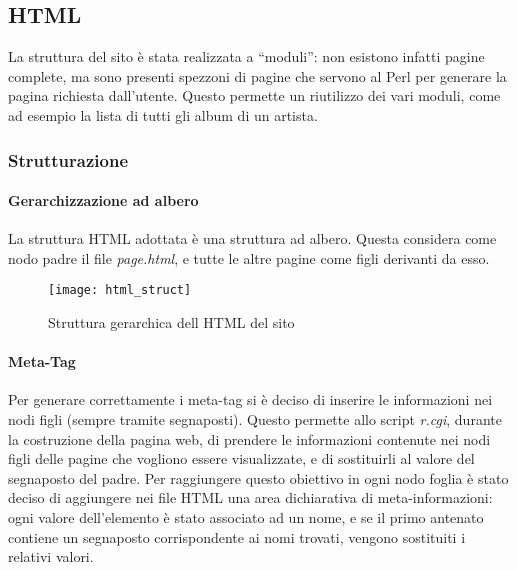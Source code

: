  \graphicspath{ {res/img/} }

\subsection{HTML}
La struttura del sito \`e stata realizzata a ``moduli'': non esistono infatti pagine complete, ma sono presenti spezzoni di pagine che servono al Perl per generare la pagina richiesta dall'utente. Questo permette un riutilizzo dei vari moduli, come ad esempio la lista di tutti gli album di un artista.
\subsubsection{Strutturazione}

\paragraph*{Gerarchizzazione ad albero}La struttura HTML adottata \`e una struttura ad albero. Questa considera come nodo padre il file \textit{page.html}, e tutte le altre pagine come figli derivanti da esso.


\begin{landscape}

  \thispagestyle{empty}

  \begin{figure}[H]
    \centering
    \texttt{[image: html\_struct]}
    \caption{Struttura gerarchica dell HTML del sito}
  \end{figure}

\end{landscape}

\restoregeometry

\paragraph*{Meta-Tag}Per generare correttamente i meta-tag si \`e deciso di inserire le informazioni nei nodi figli (sempre tramite segnaposti). Questo permette allo script \textit{r.cgi}, durante la costruzione della pagina web, di prendere le informazioni contenute nei nodi figli delle pagine che vogliono essere visualizzate, e di sostituirli al valore del segnaposto del padre. Per raggiungere questo obiettivo in ogni nodo foglia \`e stato deciso di aggiungere nei file HTML una area dichiarativa di meta-informazioni: ogni valore dell'elemento \`e stato associato ad un nome, e se il primo antenato contiene un segnaposto corrispondente ai nomi trovati, vengono sostituiti i relativi valori.

